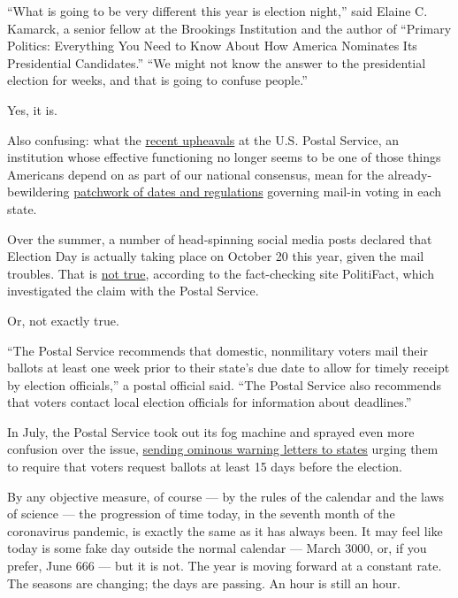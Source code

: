 ``What is going to be very different this year is election night,'' said
Elaine C. Kamarck, a senior fellow at the Brookings Institution and the
author of ``Primary Politics: Everything You Need to Know About How
America Nominates Its Presidential Candidates.'' ``We might not know the
answer to the presidential election for weeks, and that is going to
confuse people.''

Yes, it is.

Also confusing: what the
\href{https://www.nytimes3xbfgragh.onion/2020/08/15/us/post-office-vote-by-mail.html}{recent
upheavals} at the U.S. Postal Service, an institution whose effective
functioning no longer seems to be one of those things Americans depend
on as part of our national consensus, mean for the already-bewildering
\href{https://projects.fivethirtyeight.com/how-to-vote-2020/}{patchwork
of dates and regulations} governing mail-in voting in each state.

Over the summer, a number of head-spinning social media posts declared
that Election Day is actually taking place on October 20 this year,
given the mail troubles. That is
\href{https://www.politifact.com/factchecks/2020/jul/28/facebook-posts/how-early-should-you-send-your-mail-ballot-make-su/}{not
true}, according to the fact-checking site PolitiFact, which
investigated the claim with the Postal Service.

Or, not exactly true.

``The Postal Service recommends that domestic, nonmilitary voters mail
their ballots at least one week prior to their state's due date to allow
for timely receipt by election officials,'' a postal official said.
``The Postal Service also recommends that voters contact local election
officials for information about deadlines.''

In July, the Postal Service took out its fog machine and sprayed even
more confusion over the issue,
\href{https://www.nytimes3xbfgragh.onion/2020/08/15/us/elections/the-postal-service-warns-states-it-may-not-meet-mail-in-ballot-deadlines.html}{sending
ominous warning letters to states} urging them to require that voters
request ballots at least 15 days before the election.

By any objective measure, of course --- by the rules of the calendar and
the laws of science --- the progression of time today, in the seventh
month of the coronavirus pandemic, is exactly the same as it has always
been. It may feel like today is some fake day outside the normal
calendar --- March 3000, or, if you prefer, June 666 --- but it is not.
The year is moving forward at a constant rate. The seasons are changing;
the days are passing. An hour is still an hour.

